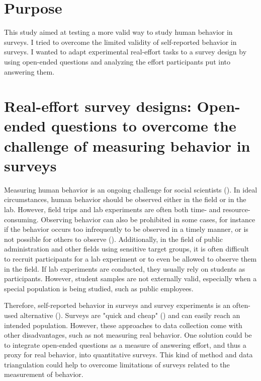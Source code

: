 \documentclass[twocolumn, serif, empirical, authordate]{jote-article}
\begin{document}
\section*{Purpose}

This study aimed at testing a more valid way to study human behavior in surveys. I tried to overcome the limited validity of self-reported behavior in surveys. I wanted to adapt experimental real-effort tasks to a survey design by using open-ended questions and analyzing the effort participants put into answering them.


\section*{Real-effort survey designs: Open-ended questions to overcome the challenge of measuring behavior in surveys}

Measuring human behavior is an ongoing challenge for social scientists (). In ideal circumstances, human behavior should be observed either in the field or in the lab. However, field trips and lab experiments are often both time- and resource-consuming.
Observing behavior can also be prohibited in some cases, for instance if the behavior occurs too infrequently to be observed in a timely manner, or is not possible for others to observe (). Additionally, in the field of public administration and other fields using sensitive target groups, it is often difficult to recruit participants for a lab experiment or to even be allowed to observe them in the field. If lab experiments are conducted, they usually rely on students as participants. However, student samples are not externally valid, especially when a special population is being studied, such as public employees.

Therefore, self-reported behavior in surveys and survey experiments is an often-used alternative (). Surveys are "quick and cheap" () and can easily reach an intended population. However, these approaches to data collection come with other disadvantages, such as not measuring real behavior. One solution could be to integrate open-ended questions as a measure of answering effort, and thus a proxy for real behavior, into quantitative surveys. This kind of method and data triangulation could help to overcome limitations of surveys related to the measurement of behavior.
\end{document}
